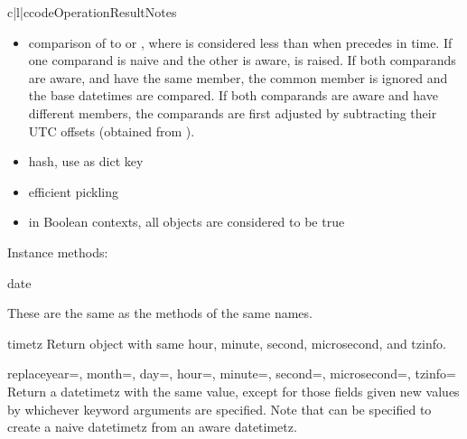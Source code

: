\begin{tableiii}{c|l|c}{code}{Operation}{Result}{Notes}
\begin{itemize}
    If both are \naive, or both are aware and have the same 
    member, subtraction acts as for  subtraction.

    If both are aware and have different  members,
     acts as if  and  were first converted to UTC
    datetimes (by subtracting  minutes from ,
    and  minutes from ), and then doing
     subtraction, except that the implementation never
    overflows.

  \item
    comparison of  to  or
    , where  is considered less than 
    when  precedes  in time.  If one comparand is naive and
    the other is aware,  is raised.  If both
    comparands are aware, and have the same  member,
    the common  member is ignored and the base datetimes
    are compared.  If both comparands are aware and have different
     members, the comparands are first adjusted by
    subtracting their UTC offsets (obtained from ).

  \item
    hash, use as dict key

  \item
    efficient pickling

  \item
    in Boolean contexts, all  objects are considered to be
    true
\end{itemize}

Instance methods:

\begin{methoddesc}{date}{}

These are the same as the  methods of the same names.
\end{methoddesc}

\begin{methoddesc}{timetz}{}
    Return  object with same hour, minute, second, microsecond,
    and tzinfo.
\end{methoddesc}

\begin{methoddesc}{replace}{year=, month=, day=, hour=, minute=, second=, microsecond=,
            tzinfo=}
    Return a datetimetz with the same value, except for those fields given
    new values by whichever keyword arguments are specified.  Note that
     can be specified to create a naive datetimetz from
    an aware datetimetz.
\end{methoddesc}


\end{tableiii}
